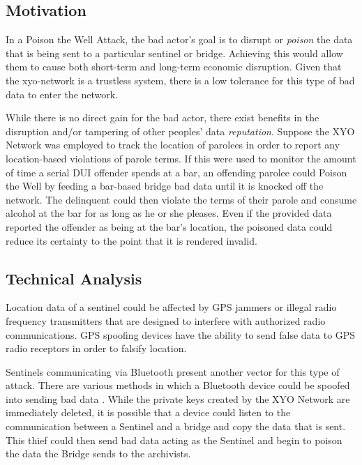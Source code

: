 \documentclass{article}
\begin{document}
\subsection{Motivation}
In a Poison the Well Attack, the bad actor's goal is to disrupt or \textit{poison} the data that is being sent to a particular \Gls{sentinel} or \Gls{bridge}. Achieving this would allow them to cause both short-term and long-term economic disruption. Given that the \Gls{xyo-network} is a \gls{trustless} system, there is a low tolerance for this type of bad data to enter the network. 

While there is no direct gain for the bad actor, there exist benefits in the disruption and/or tampering of other peoples' data \textit{reputation}. Suppose the XYO Network was employed to track the location of parolees in order to report any location-based violations of parole terms. If this were used to monitor the amount of time a serial DUI offender spends at a bar, an offending parolee could Poison the Well by feeding a bar-based \Gls{bridge} bad data until it is knocked off the network. The delinquent could then violate the terms of their parole and consume alcohol at the bar for as long as he or she pleases. Even if the provided data reported the offender as being at the bar's location, the poisoned data could reduce its certainty to the point that it is rendered invalid.

\subsection{Technical Analysis}
Location data of a \Gls{sentinel} could be affected by GPS jammers or illegal radio frequency transmitters that are designed to interfere with authorized radio communications. GPS spoofing devices \cite{jafarina-gps} have the ability to send false data to GPS radio receptors in order to falsify location. 

Sentinels communicating via Bluetooth present another vector for this type of attack. There are various methods in which a Bluetooth device could be spoofed into sending bad data \cite{padgette-bluetooth}. While the private keys created by the XYO Network are immediately deleted, it is possible that a device could listen to the communication between a Sentinel and a \Gls{bridge} and copy the data that is sent. This thief could then send bad data acting as the Sentinel and begin to poison the data the Bridge sends to the \Glspl{archivist}. 
\end{document}
